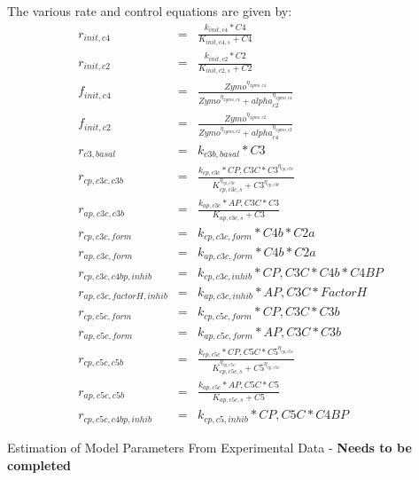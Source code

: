 \documentclass[12pt]{article}
\makeatletter
\renewcommand\subsection{\@startsection
	{subsection}{2}{0mm}
	{-0.05in}
	{-0.5\baselineskip}
	{\normalfont\normalsize\bfseries}}
\makeatother
\begin{document}
The various rate and control equations are given by:
\begin{eqnarray}
	r_{init,c4} &=& \frac{k_{init,c4}*C4}{K_{init,c4,s} + C4} \\
	r_{init,c2} &=& \frac{k_{init,c2}*C2}{K_{init,c2,s} + C2} \\
	f_{init,c4} &=& \frac{Zymo^{\eta_{zymo,c4}}}{Zymo^{\eta_{zymo,c4}} + alpha_{c2}^{\eta_{zymo,c4}}} \\
	f_{init,c2} &=& \frac{Zymo^{\eta_{zymo,c2}}}{Zymo^{\eta_{zymo,c2}} + alpha_{c4}^{\eta_{zymo,c2}}} \\
	r_{c3,basal} &=& k_{c3b,basal}*C3 \\
	r_{cp,c3c,c3b} &=& \frac{k_{cp,c3c}*CP,C3C*C3^{\eta_{cp,c3c}}}{K_{cp,c3c,s}^{\eta_{cp,c3c}} + C3^{\eta_{cp,c3c}}}  \\
	r_{ap,c3c,c3b} &=& \frac{k_{ap,c3c}*AP,C3C*C3}{K_{ap,c3c,s} + C3} \\
	r_{cp,c3c,form} &=& k_{cp,c3c,form}*C4b*C2a \\
	r_{ap,c3c,form} &=& k_{ap,c3c,form}*C4b*C2a \\
	r_{cp,c3c,c4bp,inhib} &=& k_{cp,c3c,inhib}*CP,C3C*C4b*C4BP \\
	r_{ap,c3c,factorH,inhib} &=& k_{ap,c3c,inhib}*AP,C3C*FactorH \\
	r_{cp,c5c,form} &=& k_{cp,c5c,form}*CP,C3C*C3b \\
	r_{ap,c5c,form} &=& k_{ap,c5c,form}*AP,C3C*C3b \\
	 r_{cp,c5c,c5b} &=& \frac{k_{cp,c5c}*CP,C5C*C5^{\eta_{cp,c5c}}}{K_{cp,c5c,s}^{\eta_{cp,c5c}} + C5^{\eta_{cp,c5c}}} \\
	 r_{ap,c5c,c5b} &=& \frac{k_{ap,c5c}*AP,C5C*C5}{K_{ap,c5c,s} + C5} \\
	 r_{cp,c5c,c4bp,inhib} &=& k_{cp,c5,inhib}*CP,C5C*C4BP
\end{eqnarray}

\subsection{Estimation of Model Parameters From Experimental Data - \textbf{Needs to be completed}}
\end{document}
